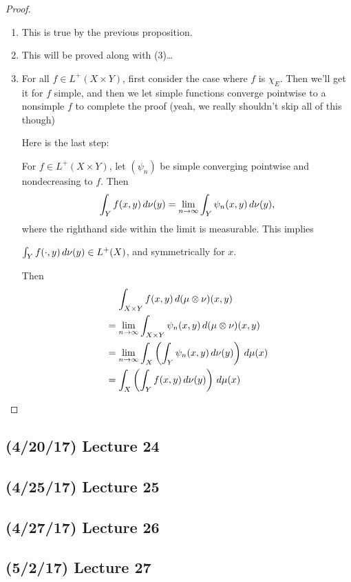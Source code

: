 \documentclass[11pt,leqno,oneside]{amsbook}
\numberwithin{thm}{section}
\newcommand{\x}{\times}
\newcommand{\ox}{\otimes}
\begin{document}
\begin{proof}
  \mbox{}
  \begin{enumerate}[label=(\arabic{*})]
    \item This is true by the previous proposition.
    \item This will be proved along with (3)\ldots
    \item For all $f \in L^+(X \x Y)$, first consider the case where $f$ is $\chi_E$.  Then we'll get it for $f$ simple, and then we let simple functions converge pointwise to a nonsimple $f$ to complete the proof (yeah, we really shouldn't skip all of this though)

    Here is the last step:

    For $f \in L^+(X \x Y)$, let $(\psi_n)$ be simple converging pointwise and nondecreasing to $f$.  Then $$\int_Y f(x,y) \, d\nu(y) = \lim_{n \to \infty} \int_Y \psi_n(x,y) \, d\nu(y),$$ where the righthand side within the limit is measurable.  This implies

    $\int_Y f(\cdot, y) \, d\nu(y) \in L^+(X)$, and symmetrically for $x$.

    Then
    \begin{align*}
      &\quad\, \int_{X \x Y} f(x,y) \d(\mu \ox \nu)(x,y) \\
      &= \lim_{n \to \oo} \int_{X \x Y} \psi_n(x,y) \d(\mu \ox \nu)(x,y) \\
      &= \lim_{n \to \oo} \int_{X} \left(\int_{Y} \psi_n(x,y) \d\nu(y) \right) \d \mu(x) \\
      &= \int_{X} \left(\int_{Y} f(x,y) \d\nu(y) \right) \d \mu(x)
    \end{align*}
  \end{enumerate}
\end{proof}


\subsection*{(4/20/17) Lecture 24}
\subsection*{(4/25/17) Lecture 25}
\subsection*{(4/27/17) Lecture 26}
\subsection*{(5/2/17) Lecture 27}
\end{document}
